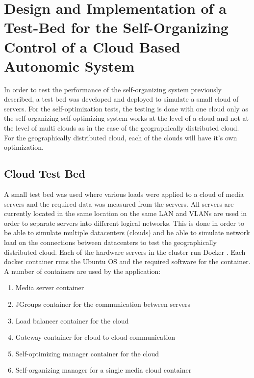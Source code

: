 \chapter{Design and Implementation of a Test-Bed for the Self-Organizing Control of a Cloud Based Autonomic System} %
\label{Chapter5}

In order to test the performance of the self-organizing system previously described, a test bed was developed and deployed to simulate a small cloud of servers. For the self-optimization tests, the testing is done with one cloud only as the self-organizing self-optimizing system works at the level of a cloud and not at the level of multi clouds as in the case of the geographically distributed cloud. For the geographically distributed cloud, each of the clouds will have it's own optimization.

\section{Cloud Test Bed}

A small test bed was used where various loads were applied to a cloud of media servers and the required data was measured from the servers. All servers are currently located in the same location on the same LAN and VLANs are used in order to separate servers into different logical networks. This is done in order to be able to simulate multiple datacenters (clouds) and be able to simulate network load on the connections between datacenters to test the geographically distributed cloud. Each of the hardware servers in the cluster run Docker \cite{cloud:docker}. Each docker container runs the Ubuntu OS and the required software for the container. A number of containers are used by the application:

\begin{enumerate}
	\item Media server container
	\item JGroups container for the communication between servers
	\item Load balancer container for the cloud
	\item Gateway container for cloud to cloud communication
	\item Self-optimizing manager container for the cloud
	\item Self-organizing manager for a single media cloud container
\end{enumerate}

